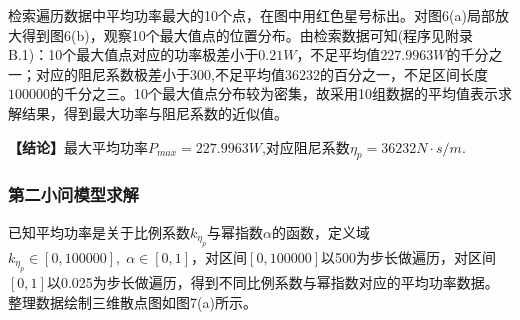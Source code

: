 \documentclass{article}
\numberwithin{equation}{subsection}
\begin{document}
检索遍历数据中平均功率最大的10个点，在图中用红色星号标出。对图6(a)局部放大得到图6(b)，观察10个最大值点的位置分布。由检索数据可知(程序见附录B.1)：10个最大值点对应的功率极差小于$0.21W$，不足平均值$227.9963W$的千分之一；对应的阻尼系数极差小于$300$,不足平均值$36232$的百分之一，不足区间长度$100000$的千分之三。10个最大值点分布较为密集，故采用10组数据的平均值表示求解结果，得到最大功率与阻尼系数的近似值。

\textbf{【结论】}最大平均功率$P_{max}=227.9963W$,对应阻尼系数$\eta _p =36232N·s/m$.


\subsubsection{第二小问模型求解}
已知平均功率是关于比例系数$k_{\eta _{p}}$与幂指数$\alpha$的函数，定义域$k_{\eta _p}\in [0,100000],\;\alpha\in[0,1]$，对区间$[0,100000]$以500为步长做遍历，对区间$[0,1]$以0.025为步长做遍历，得到不同比例系数与幂指数对应的平均功率数据。整理数据绘制三维散点图如图7(a)所示。
\end{document}
